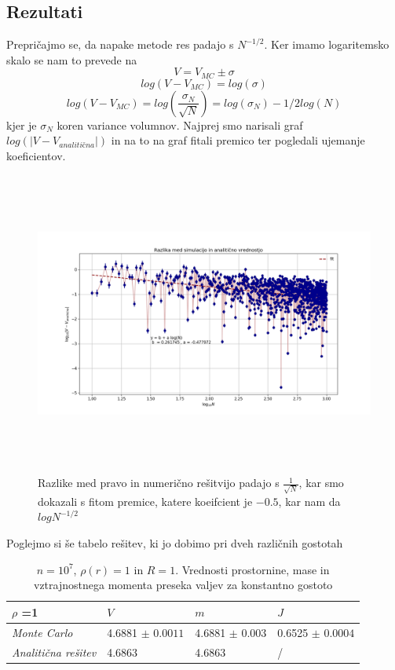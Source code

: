 \documentclass[11pt, a4paper]{article}
\begin{document}
\subsection{Rezultati}
Prepričajmo se, da napake metode res padajo s $N^{-1/2 }$. Ker imamo logaritemsko skalo se nam to prevede na 
\begin{equation}
V = V_{MC} \pm \sigma
\end{equation}
\begin{equation}
log( V -  V_{MC} ) = log (\sigma)
\end{equation}
\begin{equation}
log( V -  V_{MC} )  = log (\frac{\sigma_N}{\sqrt{N}}) = log (\sigma_N) - 1/2 log(N) 
\end{equation}
kjer je $\sigma_N$ koren variance volumnov. Najprej smo narisali graf $log (|V - V_{analitična}|)$ in na to na graf fitali premico ter pogledali ujemanje koeficientov.
\begin{figure}[H]
  
\centering
  \includegraphics[width=15cm, height=10cm]{prva_razlike.png}
 \caption{Razlike med pravo in numerično rešitvijo padajo s $\frac{1}{\sqrt{N}}$, kar smo dokazali s fitom premice, katere koeifcient je $-0.5$, kar nam da $log N^{-1/2}$}
\end{figure}  
Poglejmo si še tabelo rešitev, ki jo dobimo pri dveh različnih gostotah
\begin{table}[H]
\caption{$n=10^7$, $\rho(r)=1$ in $R=1$. Vrednosti prostornine, mase in vztrajnostnega momenta preseka valjev za konstantno gostoto}
\label{my-label}
\begin{tabular}{llll}
\centering
 $\rho$ =1 & $V$ & $m$ & $J$\\\hline
 \textit{Monte Carlo} & 4.6881 $\pm$ $0.0011$ & 4.6881 $\pm$ $0.003$ & 0.6525 $\pm$ $0.0004$\\\hline
 \textit{Analitična rešitev} & 4.6863 & 4.6863 & /
\end{tabular}
\end{table}
\end{document}

